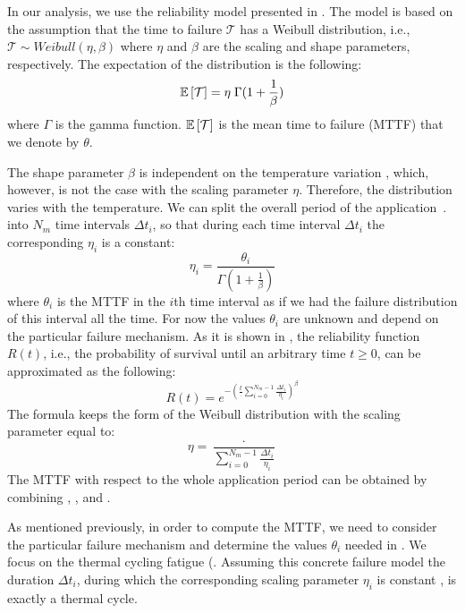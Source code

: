 \balance
In our analysis, we use the reliability model presented in \cite{huang2009, xiang2010}. The model is based on the assumption that the time to failure $\mathcal{T}$ has a Weibull distribution, i.e., $\mathcal{T} \sim Weibull(\eta, \beta)$ where $\eta$ and $\beta$ are the scaling and shape parameters, respectively. The expectation of the distribution is the following:
\begin{equation} \label{eq:general-mttf}
  \mathbb{E}\left[ \mathcal{T} \right] = \eta \; \Gamma(1 + \frac{1}{\beta})
\end{equation}
where $\Gamma$ is the gamma function. $\mathbb{E}\left[ \mathcal{T} \right]$ is the mean time to failure (MTTF) that we denote by $\theta$.

The shape parameter $\beta$ is independent on the temperature variation \cite{chang2006}, which, however, is not the case with the scaling parameter $\eta$. Therefore, the distribution varies with the temperature. We can split the overall period of the application $\period$ into $N_m$ time intervals $\Delta t_i$, so that during each time interval $\Delta t_i$ the corresponding $\eta_i$ is a constant:
\begin{equation} \label{eq:eta-one}
  \eta_i = \frac{\theta_i}{\Gamma(1 + \frac{1}{\beta})}
\end{equation}
where $\theta_i$ is the MTTF in the $i$th time interval as if we had the failure distribution of this interval all the time. For now the values $\theta_i$ are unknown and depend on the particular failure mechanism. As it is shown in \cite{xiang2010}, the reliability function $R(t)$, i.e., the probability of survival until an arbitrary time $t \geq 0$, can be approximated as the following:
\[
  R(t) = e^{-(\frac{t}{\period} \sum_{i=0}^{N_m - 1} \frac{\Delta t_i}{\eta_i})^\beta}
\]
The formula keeps the form of the Weibull distribution with the scaling parameter equal to:
\begin{equation} \label{eq:eta-many}
  \eta = \frac{\period}{\sum_{i=0}^{N_m - 1} \frac{\Delta t_i}{\eta_i}}
\end{equation}
The MTTF with respect to the whole application period can be obtained by combining , , and .

As mentioned previously, in order to compute the MTTF, we need to consider the particular failure mechanism and determine the values $\theta_i$ needed in . We focus on the thermal cycling fatigue (. Assuming this concrete failure model the duration $\Delta t_i$, during which the corresponding scaling parameter $\eta_i$ is constant , is exactly a thermal cycle.


